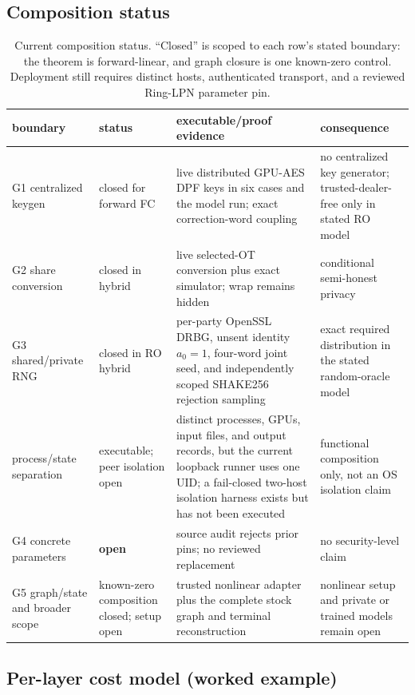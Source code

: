 \documentclass[11pt]{article}
\begin{document}
\subsection{Composition status}
\label{sec:design-composition}
\begin{table}[ht]
\centering
\small
\begin{tabular}{>{\raggedright\arraybackslash}p{2.6cm}>{\raggedright\arraybackslash}p{2.1cm}>{\raggedright\arraybackslash}p{5.3cm}>{\raggedright\arraybackslash}p{2.7cm}}
\toprule
boundary & status & executable/proof evidence & consequence\\
\midrule
G1 centralized keygen & closed for forward FC & live distributed GPU-AES DPF
keys in six cases and the model run; exact correction-word coupling &
no centralized key generator; trusted-dealer-free only in stated RO model\\
G2 share conversion & closed in hybrid & live selected-OT conversion plus
exact simulator; wrap remains hidden & conditional semi-honest privacy\\
G3 shared/private RNG & closed in RO hybrid & per-party OpenSSL DRBG, unsent
identity $a_0=1$, four-word joint seed, and independently scoped SHAKE256
rejection sampling & exact required distribution in the stated random-oracle
model\\
process/state separation & executable; peer isolation open & distinct
processes, GPUs, input files, and output records, but the current loopback
runner uses one UID; a fail-closed two-host isolation harness exists but has
not been executed & functional composition only, not an OS isolation claim\\
G4 concrete parameters & \textbf{open} & source audit rejects prior pins; no
reviewed replacement & no security-level claim\\
G5 graph/state and broader scope & known-zero composition closed; setup open &
trusted nonlinear adapter plus the complete stock graph and terminal
reconstruction & nonlinear setup and private or trained models remain open\\
\bottomrule
\end{tabular}
\caption{Current composition status. ``Closed'' is scoped to each row's stated
boundary: the theorem is forward-linear, and graph closure is one known-zero
control. Deployment still requires distinct hosts, authenticated transport,
and a reviewed Ring-LPN parameter pin.}
\label{tab:composition}
\end{table}

\subsection{Per-layer cost model (worked example)}
\label{sec:design-cost}
\end{document}
